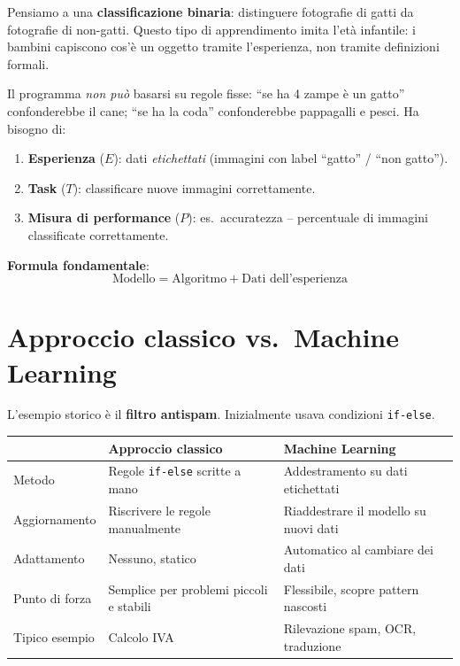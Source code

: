 Pensiamo a una \textbf{classificazione binaria}: distinguere fotografie di gatti da fotografie di non-gatti. Questo tipo di apprendimento imita l'età infantile: i bambini capiscono cos'è un oggetto tramite l'esperienza, non tramite definizioni formali.

Il programma \emph{non può} basarsi su regole fisse: ``se ha 4 zampe è un gatto'' confonderebbe il cane; ``se ha la coda'' confonderebbe pappagalli e pesci. Ha bisogno di:

\begin{enumerate}
    \item \textbf{Esperienza} ($E$): dati \emph{etichettati} (immagini con label ``gatto'' / ``non gatto'').
    \item \textbf{Task} ($T$): classificare nuove immagini correttamente.
    \item \textbf{Misura di performance} ($P$): es.\ accuratezza -- percentuale di immagini classificate correttamente.
\end{enumerate}

\textbf{Formula fondamentale}:
\[
\boxed{\text{Modello} = \text{Algoritmo} + \text{Dati dell'esperienza}}
\]

\section{Approccio classico vs.\ Machine Learning}

L'esempio storico è il \textbf{filtro antispam}. Inizialmente usava condizioni \texttt{if-else}.

\begin{center}
\renewcommand{\arraystretch}{1.3}
\begin{tabular}{@{} l p{6cm} p{6cm} @{}}
\toprule
& \textbf{Approccio classico} & \textbf{Machine Learning} \\
\midrule
Metodo & Regole \texttt{if-else} scritte a mano & Addestramento su dati etichettati \\
Aggiornamento & Riscrivere le regole manualmente & Riaddestrare il modello su nuovi dati \\
Adattamento & Nessuno, statico & Automatico al cambiare dei dati \\
Punto di forza & Semplice per problemi piccoli e stabili & Flessibile, scopre pattern nascosti \\
Tipico esempio & Calcolo IVA & Rilevazione spam, OCR, traduzione \\
\bottomrule
\end{tabular}
\end{center}


